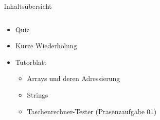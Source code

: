 \documentclass[
  german,            %
  aspectratio=169,    %
]{tumbeamer}
\begin{document}
\begin{frame}[c]{Inhaltsübersicht}{}
  \begin{columns}[c]
    \begin{column}{1\textwidth}
      \begin{itemize}
        \item Quiz
        \item Kurze Wiederholung
        \item Tutorblatt
        \begin{itemize}
          \item Arrays und deren Adressierung
          \item Strings
          \item Taschenrechner-Tester (Präsenzaufgabe 01)
        \end{itemize}
      \end{itemize}
    \end{column}
  \end{columns}
\end{frame}
\end{document}
